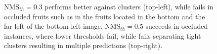\begin{figure}[!ht]
  \centering
  
  \caption{$\text{NMS}_{th}=0.3$ performs better against clusters (top-left), while fails in occluded fruits such as in the fruits located in the bottom and the far left of the bottom-left image. $\text{NMS}_{th}=0.5$ succeeds in occluded instances, where lower thresholds fail, while fails separating tight clusters resulting in multiple predictions (top-right).}
  \label{ch4:fig6}
\end{figure}

